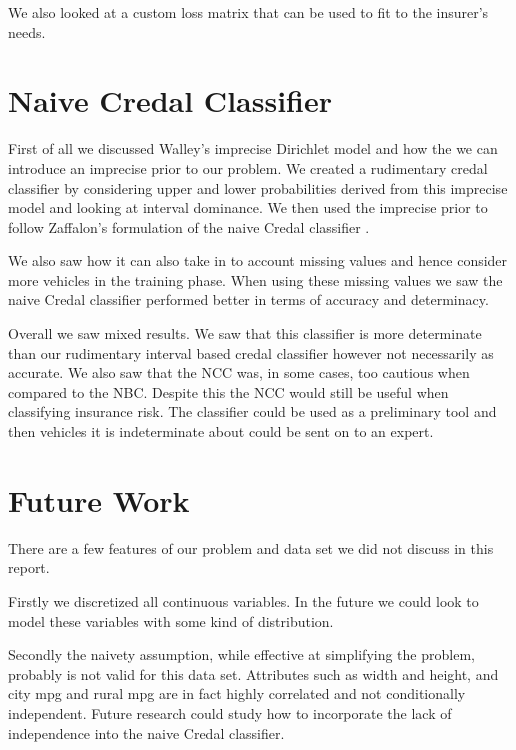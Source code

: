 We also looked at a custom loss matrix that can be used to fit to the insurer's needs.

\section{Naive Credal Classifier}

First of all we discussed Walley's imprecise Dirichlet model \cite{Walley91} and how the we can introduce an imprecise prior to our problem.
We created a rudimentary credal classifier by considering upper and lower probabilities derived from this imprecise model and looking at interval dominance.
We then used the imprecise prior to follow Zaffalon's formulation of the naive Credal classifier \cite{Zaffalon01}.

We also saw how it can also take in to account missing values and hence consider more vehicles in the training phase.
When using these missing values we saw the naive Credal classifier performed better in terms of accuracy and determinacy.

Overall we saw mixed results.
We saw that this classifier is more determinate than our rudimentary interval based credal classifier however not necessarily as accurate.
We also saw that the NCC was, in some cases, too cautious when compared to the NBC.
Despite this the NCC would still be useful when classifying insurance risk.
The classifier could be used as a preliminary tool and then vehicles it is indeterminate about could be sent on to an expert.

\section{Future Work}

There are a few features of our problem and data set we did not discuss in this report.

Firstly we discretized all continuous variables.
In the future we could look to model these variables with some kind of distribution.

Secondly the naivety assumption, while effective at simplifying the problem, probably is not valid for this data set.
Attributes such as width and height, and city mpg and rural mpg are in fact highly correlated and not conditionally independent.
Future research could study how to incorporate the lack of independence into the naive Credal classifier.